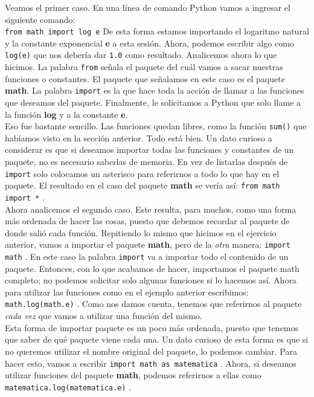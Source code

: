 \documentclass[10pt,letterpaper]{article}
\newcommand{\inlinecode}[1]{
\colorbox{light-gray}{\texttt{#1}}
}
\begin{document}
Veamos el primer caso. En una l\'inea de comando Python vamos a ingresar el siguiente comando:\\
\inlinecode{from math import log e} De esta forma estamos importando el logaritmo natural y la constante exponencial \textbf{e} a esta sesi\'on. Ahora, podemos escribir algo como \inlinecode{log(e)} que nos deber\'ia dar \inlinecode{1.0} como resultado. Analicemos ahora lo que hicimos. La palabra \inlinecode{from} se\~nala el paquete del cu\'al vamos a sacar nuestras funciones o constantes. El paquete que se\~nalamos en este caso es el paquete \textbf{math}. La palabra \inlinecode{import} es la que hace toda la acci\'on de llamar a las funciones que deseamos del paquete. Finalmente, le solicitamos a Python que solo llame a la funci\'on \textbf{log} y a la constante \textbf{e}.\\

Eso fue bastante sencillo. Las funciones quedan libres, como la funci\'on \inlinecode{sum()} que hab\'iamos visto en la secci\'on anterior. Todo est\'a bien. Un dato curioso a considerar es que si deseamos importar todas las funciones y constantes de un paquete, no es necesario saberlas de memoria. En vez de listarlas despu\'es de \inlinecode{import} solo colocamos un asterisco para referirnos a todo lo que hay en el paquete. El resultado en el caso del paquete \textbf{math} se ver\'ia as\'i: \inlinecode{from math import *}.\\

Ahora analicemos el segundo caso. Este resulta, para muchos, como una forma m\'as ordenada de hacer las cosas, puesto que debemos recordar al paquete de donde sali\'o cada funci\'on. Repitiendo lo mismo que hicimos en el ejercicio anterior, vamos a importar el paquete \textbf{math}, pero de la \emph{otra} manera: \inlinecode{import math}. En este caso la palabra \inlinecode{import} va a importar todo el contenido de un paquete. Entonces, con lo que acabamos de hacer, importamos el paquete math completo; no podemos solicitar solo algunas funciones si lo hacemos as\'i. Ahora para utilizar las funciones como en el ejemplo anterior escribimos: \inlinecode{math.log(math.e)}. Como nos damos cuenta, tenemos que referirnos al paquete \emph{cada vez} que vamos a utilizar una funci\'on del mismo.\\

Esta forma de importar paquete es un poco m\'as ordenada, puesto que tenemos que saber de qu\'e paquete viene cada una. Un dato curioso de esta forma es que si no queremos utilizar el nombre original del paquete, lo podemos cambiar. Para hacer esto, vamos a escribir \inlinecode{import math as matematica}. Ahora, si deseamos utilizar funciones del paquete \textbf{math}, podemos referirnos a ellas como \inlinecode{matematica.log(matematica.e)}.
\end{document}
